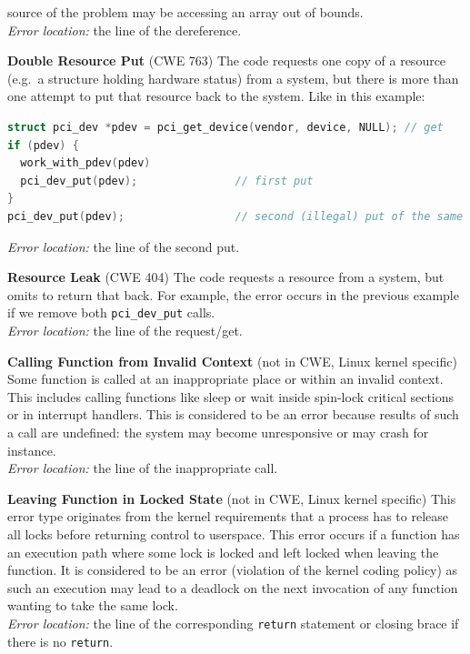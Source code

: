 \documentclass[10pt]{llncs}
\begin{document}
\begin{description}
  source of the problem may be accessing an array out of bounds. \\
  \emph{Error location:} the line of the dereference.
\item \textbf{Double Resource Put} (CWE 763) The code requests one copy of a
  resource (e.g.~a structure holding hardware status) from a system, but
  there is more than one attempt to put that resource back to the
  system. Like in this example:
  \begin{lstlisting}[language=C]
struct pci_dev *pdev = pci_get_device(vendor, device, NULL); // get
if (pdev) {
  work_with_pdev(pdev)
  pci_dev_put(pdev);               // first put
}
pci_dev_put(pdev);                 // second (illegal) put of the same
  \end{lstlisting}
  \emph{Error location:} the line of the second put.
\item \textbf{Resource Leak} (CWE 404) The code requests a resource from a
  system, but omits to return that back. For example, the error occurs in
  the previous example if we remove both \texttt{pci\_dev\_put} calls. \\
  \emph{Error location:} the line of the request/get.
\item \textbf{Calling Function from Invalid Context} (not in CWE, Linux
  kernel specific) Some function is called at an inappropriate place or within
  an invalid context. This includes calling functions like sleep or wait
  inside spin-lock critical sections or in interrupt handlers. This is
  considered to be an error because results of such a call are undefined: the
  system may become unresponsive or may crash for instance. \\
  \emph{Error location:} the line of the inappropriate call.
\item \textbf{Leaving Function in Locked State} (not in CWE, Linux kernel
  specific) This error type originates from the kernel requirements that a
  process has to release all locks before returning control to userspace.
  This error occurs if a function has an execution path where some lock is
  locked and left locked when leaving the function. It is considered to be
  an error (violation of the kernel coding policy) as such an execution may
  lead to a deadlock on the next invocation of any function wanting to take
  the same lock. \\
  \emph{Error location:} the line of the corresponding \texttt{return}
  statement or closing brace if there is no \texttt{return}.
\end{description}
\end{document}
